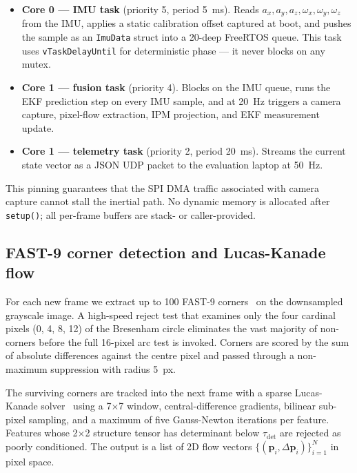 \documentclass[conference]{IEEEtran}
\begin{document}
\begin{itemize}
\item \textbf{Core 0 --- IMU task} (priority 5, period 5~ms).
Reads ${a_x, a_y, a_z, \omega_x, \omega_y, \omega_z}$ from the IMU,
applies a static calibration offset captured at boot, and pushes
the sample as an \texttt{ImuData} struct into a 20-deep FreeRTOS
queue.  This task uses \texttt{vTaskDelayUntil} for deterministic
phase --- it never blocks on any mutex.
\item \textbf{Core 1 --- fusion task} (priority 4).  Blocks on
the IMU queue, runs the EKF prediction step on every IMU sample,
and at 20~Hz triggers a camera capture, pixel-flow extraction, IPM
projection, and EKF measurement update.
\item \textbf{Core 1 --- telemetry task} (priority 2, period
20~ms).  Streams the current state vector as a JSON UDP packet
to the evaluation laptop at 50~Hz.
\end{itemize}

This pinning guarantees that the SPI DMA traffic associated with
camera capture cannot stall the inertial path.  No dynamic memory is
allocated after \texttt{setup()}; all per-frame buffers are stack- or
caller-provided.

\subsection{FAST-9 corner detection and Lucas-Kanade flow}
\label{sec:tracking}
For each new frame we extract up to 100 FAST-9
corners~\cite{rosten2010fast} on the downsampled grayscale image.
A high-speed reject test that examines only the four cardinal pixels
(0, 4, 8, 12) of the Bresenham circle eliminates the vast majority of
non-corners before the full 16-pixel arc test is invoked.  Corners
are scored by the sum of absolute differences against the centre
pixel and passed through a non-maximum suppression with radius 5~px.

The surviving corners are tracked into the next frame with a sparse
Lucas-Kanade solver~\cite{lucas1981kanade,bouguet2001pyramidal} using
a 7$\times$7 window, central-difference gradients, bilinear sub-pixel
sampling, and a maximum of five Gauss-Newton iterations per feature.
Features whose 2$\times$2 structure tensor has determinant below
$\tau_{\det}$ are rejected as poorly conditioned.  The output is a
list of 2D flow vectors $\{(\mathbf{p}_i, \Delta\mathbf{p}_i)\}_{i=1}^{N}$
in pixel space.
\end{document}
